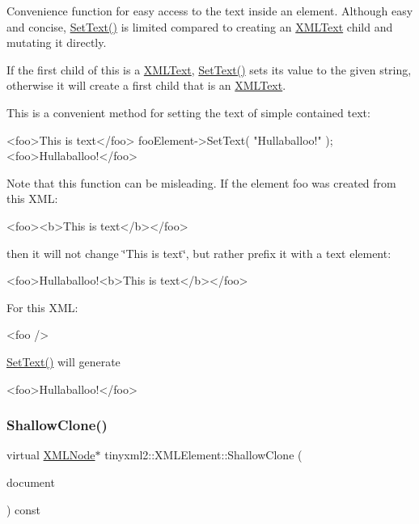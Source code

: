 Convenience function for easy access to the text inside an element. Although easy and concise, \mbox{\hyperlink{classtinyxml2_1_1XMLElement_a1f9c2cd61b72af5ae708d37b7ad283ce}{Set\+Text()}} is limited compared to creating an \mbox{\hyperlink{classtinyxml2_1_1XMLText}{X\+M\+L\+Text}} child and mutating it directly.

If the first child of \textquotesingle{}this\textquotesingle{} is a \mbox{\hyperlink{classtinyxml2_1_1XMLText}{X\+M\+L\+Text}}, \mbox{\hyperlink{classtinyxml2_1_1XMLElement_a1f9c2cd61b72af5ae708d37b7ad283ce}{Set\+Text()}} sets its value to the given string, otherwise it will create a first child that is an \mbox{\hyperlink{classtinyxml2_1_1XMLText}{X\+M\+L\+Text}}.

This is a convenient method for setting the text of simple contained text\+: \begin{DoxyVerb}<foo>This is text</foo>
    fooElement->SetText( "Hullaballoo!" );
<foo>Hullaballoo!</foo>
\end{DoxyVerb}


Note that this function can be misleading. If the element foo was created from this X\+ML\+: \begin{DoxyVerb}    <foo><b>This is text</b></foo>
\end{DoxyVerb}


then it will not change \char`\"{}\+This is text\char`\"{}, but rather prefix it with a text element\+: \begin{DoxyVerb}    <foo>Hullaballoo!<b>This is text</b></foo>
\end{DoxyVerb}


For this X\+ML\+: \begin{DoxyVerb}    <foo />
\end{DoxyVerb}
 \mbox{\hyperlink{classtinyxml2_1_1XMLElement_a1f9c2cd61b72af5ae708d37b7ad283ce}{Set\+Text()}} will generate \begin{DoxyVerb}    <foo>Hullaballoo!</foo>
\end{DoxyVerb}
 \mbox{\label{classtinyxml2_1_1XMLElement_ac035742d68b0c50c3f676374e59fe750}} 
\subsubsection{\texorpdfstring{ShallowClone()}{ShallowClone()}}
{\footnotesize\ttfamily virtual \mbox{\hyperlink{classtinyxml2_1_1XMLNode}{X\+M\+L\+Node}}$\ast$ tinyxml2\+::\+X\+M\+L\+Element\+::\+Shallow\+Clone (\begin{DoxyParamCaption}\item[{\mbox{\hyperlink{classtinyxml2_1_1XMLDocument}{X\+M\+L\+Document}} $\ast$}]{document }\end{DoxyParamCaption}) const\hspace{0.3cm}{\ttfamily [virtual]}}

